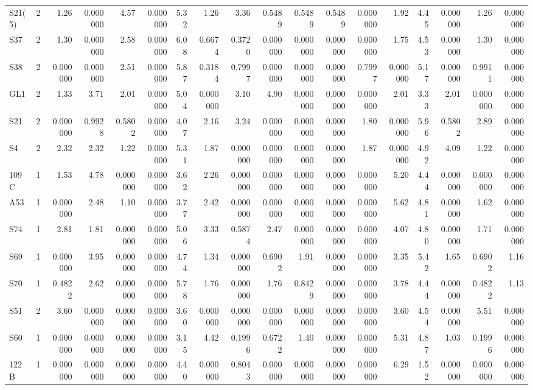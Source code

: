 {\begin{longtable}{lrrrrrrrrrrrrrrrrr}
  S21(5) & 2 & 1.26 & 0.000000 & 4.57 & 0.000000 & 5.32 & 1.26 & 3.36 & 0.5489 & 0.5489 & 0.5489 & 0.000000 & 1.92 & 4.45 & 0.000000 & 1.26 & 0.000000 \\
  S37 & 2 & 1.30 & 0.000000 & 2.58 & 0.000000 & 6.08 & 0.6674 & 0.3720 & 0.000000 & 0.000000 & 0.000000 & 0.000000 & 1.75 & 4.53 & 0.000000 & 1.30 & 0.000000 \\
  S38 & 2 & 0.000000 & 0.000000 & 2.51 & 0.000000 & 5.87 & 0.3184 & 0.7997 & 0.000000 & 0.000000 & 0.000000 & 0.7997 & 0.000000 & 5.17 & 0.000000 & 0.9911 & 0.000000 \\
  GL1 & 2 & 1.33 & 3.71 & 2.01 & 0.000000 & 5.04 & 0.000000 & 3.10 & 4.90 & 0.000000 & 0.000000 & 0.000000 & 2.01 & 3.33 & 2.01 & 0.000000 & 0.000000 \\
  S21 & 2 & 0.000000 & 0.9928 & 0.5802 & 0.000000 & 4.07 & 2.16 & 3.24 & 0.000000 & 0.000000 & 0.000000 & 1.80 & 0.000000 & 5.96 & 0.5802 & 2.89 & 0.000000 \\
  S4 & 2 & 2.32 & 2.32 & 1.22 & 0.000000 & 5.31 & 1.87 & 0.000000 & 0.000000 & 0.000000 & 0.000000 & 1.87 & 0.000000 & 4.92 & 4.09 & 1.22 & 0.000000 \\
  109C & 1 & 1.53 & 4.78 & 0.000000 & 0.000000 & 3.62 & 2.26 & 0.000000 & 0.000000 & 0.000000 & 0.000000 & 0.000000 & 5.20 & 4.44 & 0.000000 & 0.000000 & 0.000000 \\
  A53 & 1 & 0.000000 & 2.48 & 1.10 & 0.000000 & 3.77 & 2.42 & 0.000000 & 0.000000 & 0.000000 & 0.000000 & 0.000000 & 5.62 & 4.81 & 0.000000 & 1.62 & 0.000000 \\
  S74 & 1 & 2.81 & 1.81 & 0.000000 & 0.000000 & 5.06 & 3.33 & 0.5874 & 2.47 & 0.000000 & 0.000000 & 0.000000 & 4.07 & 4.80 & 0.000000 & 1.71 & 0.000000 \\
  S69 & 1 & 0.000000 & 3.95 & 0.000000 & 0.000000 & 4.74 & 1.34 & 0.000000 & 0.6902 & 1.91 & 0.000000 & 0.000000 & 3.35 & 5.42 & 1.65 & 0.6902 & 1.16 \\
  S70 & 1 & 0.4822 & 2.62 & 0.000000 & 0.000000 & 5.78 & 1.76 & 0.000000 & 1.76 & 0.8429 & 0.000000 & 0.000000 & 3.78 & 4.44 & 0.000000 & 0.4822 & 1.13 \\
  S51 & 2 & 3.60 & 0.000000 & 0.000000 & 0.000000 & 3.60 & 0.000000 & 0.000000 & 0.000000 & 0.000000 & 0.000000 & 0.000000 & 3.60 & 4.54 & 0.000000 & 5.51 & 0.000000 \\
  S60 & 1 & 0.000000 & 0.000000 & 0.000000 & 0.000000 & 3.15 & 4.42 & 0.1996 & 0.6722 & 1.40 & 0.000000 & 0.000000 & 5.31 & 4.87 & 1.03 & 0.1996 & 0.000000 \\
  122B & 1 & 0.000000 & 0.000000 & 0.000000 & 0.000000 & 4.40 & 0.000000 & 0.8043 & 0.000000 & 0.000000 & 0.000000 & 0.000000 & 6.29 & 1.52 & 0.000000 & 0.000000 & 0.000000 \\

\end{longtable}}
